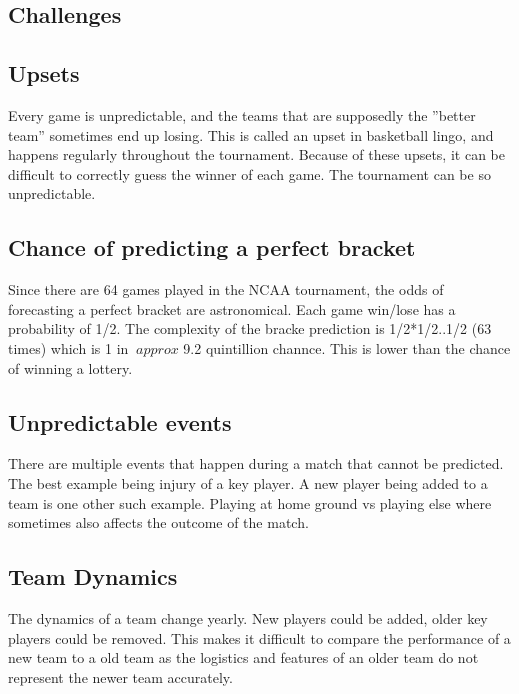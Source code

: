 \documentclass{article}
\newcommand{\drawTable}[1]{
	\noindent
	\scalebox{0.865}{
	    \pgfplotstabletypeset[
			col sep=comma,
			string type,
			column type={
				p{0.9\textwidth}
			},
			every head row/.style={
			        before row=\hline,
			        after row=\hline
		        },
			every last row/.style={
			        after row=\hline
		        },				
			display columns/0/.style={
				column type/.add={
					|p{.2\textwidth}|
				}{|}
			}
	    ]{#1}
	}
	\newline\newline\newline
}
\begin{document}
	\drawTable{table_1_data.csv}
			    
    	\begin{multicols}{2}  
	\section{Challenges}
	\subsection{Upsets}
	Every game is unpredictable, and the teams that are supposedly the ”better team” sometimes end up losing. This
is called an upset in basketball lingo, and happens regularly throughout the tournament. Because of these upsets, it can be difficult to correctly guess the winner of each game. The tournament can be so unpredictable.\cite{2}

	\subsection{Chance of predicting a perfect bracket}
	Since there are 64 games played in the NCAA tournament,
the odds of forecasting a perfect bracket are astronomical. Each game win/lose has a probability of 1/2. The complexity of the bracke prediction is 1/2*1/2..1/2 (63 times) which is 1 in $~approx$ 9.2 quintillion channce. This is lower than the chance of winning a lottery.

	\subsection{Unpredictable events}
	There are multiple events that happen during a match that cannot be predicted. The best example being injury of a key player. A new player being added to a team is one other such example. Playing at home ground vs playing else where sometimes also affects the outcome of the match.
	
	\subsection{Team Dynamics}
	The dynamics of a team change yearly. New players could be added, older key players could be removed. This makes it difficult to compare the performance of a new team to a old team as the logistics and features of an older team do not represent the newer team accurately. 
	

\end{multicols}
\end{document}
